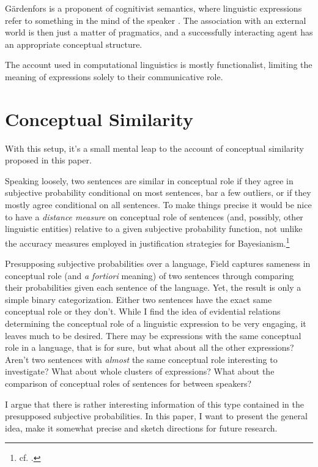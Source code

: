 \documentclass[11pt, a4paper]{article}
\renewcommand{\i}[1]{\emph{#1}}
\begin{document}
Gärdenfors is a proponent of cognitivist semantics, where linguistic expressions refer to something in the mind of the speaker \parencite[154]{gärdenfors2004conceptual}. The association with an external world is then just a matter of pragmatics, and a successfully interacting agent has an appropriate conceptual structure. 

The account used in computational linguistics is mostly functionalist, limiting the meaning of expressions solely to their communicative role. 
\section{Conceptual Similarity}

With this setup, it's a small mental leap to the account of conceptual similarity proposed in this paper. 

Speaking loosely, two sentences are similar in conceptual role if they agree in subjective probability conditional on most sentences, bar a few outliers, or if they mostly agree conditional on all sentences. To make things precise it would be nice to have a \emph{distance measure} on conceptual role of sentences (and, possibly, other linguistic entities) relative to a given subjective probability function, not unlike the accuracy measures employed in justification strategies for Bayesianism.\footnote{cf. \textcite{Leitgeb2010}.}

Presupposing subjective probabilities over a language, Field captures sameness in conceptual role (and \i{a fortiori} meaning) of two sentences through comparing their probabilities given each sentence of the language. Yet, the result is only a simple binary categorization. Either two sentences have the exact same conceptual role or they don't. While I find the idea of evidential relations determining the conceptual role of a linguistic expression to be very engaging, it leaves much to be desired. There may be expressions with the same conceptual role in a language, that is for sure, but what about all the other expressions? Aren't two sentences with \i{almost} the same conceptual role interesting to investigate? What about whole clusters of expressions? What about the comparison of conceptual roles of sentences for between speakers?

I argue that there is rather interesting information of this type contained in the presupposed subjective probabilities. In this paper, I want to present the general idea, make it somewhat precise and sketch directions for future research.
\end{document}
